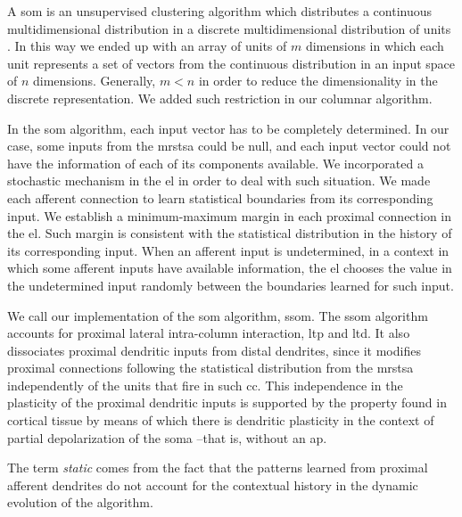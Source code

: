 \documentclass[10pt,letterpaper]{article}
\begin{document}
A \gls{som} is an unsupervised clustering algorithm which distributes a continuous multidimensional distribution
in a discrete multidimensional distribution of units \cite{Kohonen:1989:SAM:69371, kohonen_2082}.
In this way we ended up with an array of units of $m$ dimensions in which each unit
represents a set of vectors from the continuous distribution in an input space of $n$ dimensions.
Generally, $m < n$ in order to reduce the dimensionality in the discrete representation.
We added such restriction in our columnar algorithm.

In the \gls{som} algorithm, each input vector has to be completely determined.
In our case, some inputs from the \gls{mrstsa} could be null,
and each input vector could not have the information of each of its components available.
We incorporated a stochastic mechanism in the \gls{el} in order to deal with such situation.
We made each afferent connection to learn statistical boundaries from its corresponding input.
We establish a minimum-maximum margin in each proximal connection in the \gls{el}.
Such margin is consistent with the statistical distribution in the history of its corresponding input.
When an afferent input is undetermined, in a context in which some afferent inputs have
available information,
the \gls{el} chooses
the value in the undetermined input
randomly
between the boundaries learned for such input.

We call our implementation of the \gls{som} algorithm, \gls{ssom}.
The \gls{ssom} algorithm accounts for proximal lateral intra-column interaction, \gls{ltp} and
\gls{ltd}.
It also dissociates proximal dendritic inputs from distal dendrites, since
it modifies
proximal connections
following the statistical distribution from the
\gls{mrstsa} independently of the units that fire in such \gls{cc}.
This independence in the plasticity of the proximal dendritic inputs
is supported by
the
property
found in cortical tissue by means of which there is dendritic plasticity
in the context of partial depolarization of the soma \cite{reiter_1998}--that is, without an \gls{ap}. %

The term \textit{static} comes from the fact that the patterns learned from proximal afferent
dendrites do not account for the contextual history in the dynamic evolution
of the algorithm.








~\\
~\\
~\\
\end{document}
